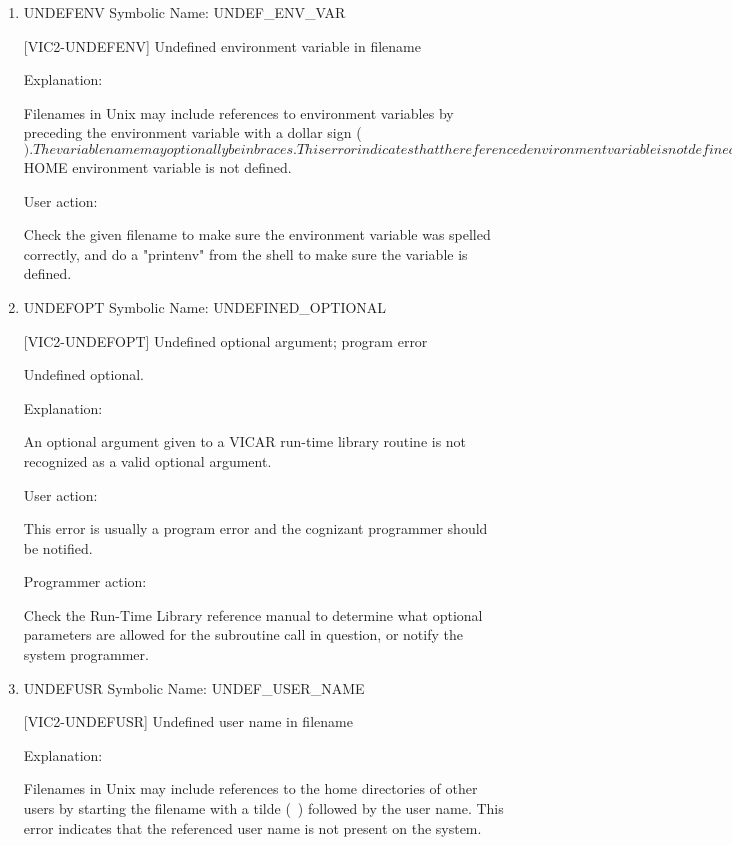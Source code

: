 \begin{enumerate}
User action:

Check the given filename to make sure that a closing brace exists
if you used an opening brace.


\item UNDEFENV Symbolic Name: UNDEF\_ENV\_VAR

[VIC2-UNDEFENV] Undefined environment variable in filename

Explanation:

Filenames in Unix may include references to environment variables by
preceding the environment variable with a dollar sign ($).  The variable
name may optionally be in {braces}.  This error indicates that the
referenced environment variable is not defined.  This error may also
occur if the user's home directory was specified via a tilde (~) with
no username, and the $HOME environment variable is not defined.

User action:

Check the given filename to make sure the environment variable was
spelled correctly, and do a "printenv" from the shell to make sure
the variable is defined.


\item UNDEFOPT Symbolic Name: UNDEFINED\_OPTIONAL

[VIC2-UNDEFOPT] Undefined optional argument; program error

Undefined optional.

Explanation:

An optional argument given to a VICAR run-time library routine
is not recognized as a valid optional argument.

User action:

This error is usually a program error and the cognizant
programmer should be notified.

Programmer action:

Check the Run-Time Library reference manual to determine what
optional parameters are allowed for the subroutine call in question,
or notify the system programmer.


\item UNDEFUSR Symbolic Name: UNDEF\_USER\_NAME

[VIC2-UNDEFUSR] Undefined user name in filename

Explanation:

Filenames in Unix may include references to the home directories
of other users by starting the filename with a tilde (~) followed
by the user name.  This error indicates that the referenced user name
is not present on the system.


\end{enumerate}
